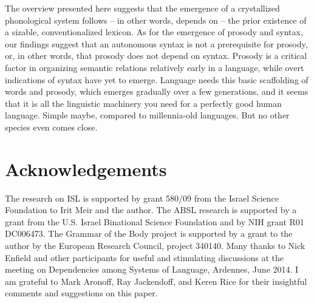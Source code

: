 \documentclass[output=paper]{langsci/langscibook}
\begin{document}
The overview presented here suggests that the emergence of a crystallized phonological system follows -- in other words, depends on -- the prior existence of a sizable, conventionalized lexicon.  As for the emergence of prosody and syntax, our findings suggest that an autonomous syntax is not a prerequisite for prosody, or, in other words, that prosody does not depend on syntax.  Prosody is a critical factor in organizing semantic relations relatively early in a language, while overt indications of syntax have yet to emerge.  Language needs this basic scaffolding of words and prosody, which emerges gradually over a few generations, and it seems that it is all the linguistic machinery you need for a perfectly good human language. %
Simple maybe, compared to millennia-old languages.  But no other species even comes close.  

\section*{Acknowledgements}
The research on ISL is supported by grant 580/09 from the Israel Science Foundation to Irit Meir and the author. The ABSL research is supported by a grant from the U.S. Israel Binational Science Foundation and by NIH grant R01 DC006473.  The Grammar of the Body project is supported by a grant to the author by the European Research Council, project 340140.  Many thanks to Nick Enfield and other participants for useful and stimulating discussions at the meeting on Dependencies among Systems of Language, Ardennes, June 2014.  I am grateful to Mark Aronoff, Ray Jackendoff, and Keren Rice for their insightful comments and suggestions on this paper. 

{\sloppy
\printbibliography[heading=subbibliography,notkeyword=this]
}
\end{document}
